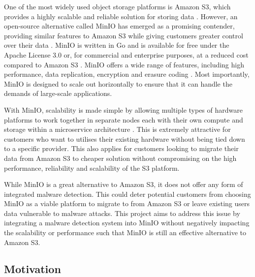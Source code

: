 \documentclass[12pt, conference, final, a4paper, onecolumn, compsoc]{IEEEtran}
\begin{document}
One of the most widely used object storage platforms is Amazon S3, which
provides a highly scalable and reliable solution for storing data
\citep{cloud-review}. However, an open-source alternative called MinIO has
emerged as a promising contender, providing similar features to Amazon S3 while
giving customers greater control over their data \citep{minio}. MinIO is written
in Go and is available for free under the Apache License 3.0 or, for commercial
and enterprise purposes, at a reduced cost compared to Amazon S3
\citep{minio-pricing}. MinIO offers a wide range of features, including high
performance, data replication, encryption and erasure coding \citep{minio}. Most
importantly, MinIO is designed to scale out horizontally to ensure that it can
handle the demands of large-scale applications.

With MinIO, scalability is made simple by allowing multiple types of hardware
platforms to work together in separate nodes each with their own compute and
storage within a microservice architecture \citep{minio}. This is extremely
attractive for customers who want to utilises their existing hardware without
being tied down to a specific provider. This also applies for customers looking
to migrate their data from Amazon S3 to cheaper solution without compromising on
the high performance, reliability and scalability of the S3 platform.

While MinIO is a great alternative to Amazon S3, it does not offer any form of
integrated malware detection. This could deter potential customers from choosing
MinIO as a viable platform to migrate to from Amazon S3 or leave existing users
data vulnerable to malware attacks. This project aims to address this issue by
integrating a malware detection system into MinIO without negatively impacting
the scalability or performance such that MinIO is still an effective alternative
to Amazon S3.


\subsection{Motivation} %
\paragraph{}
\end{document}
